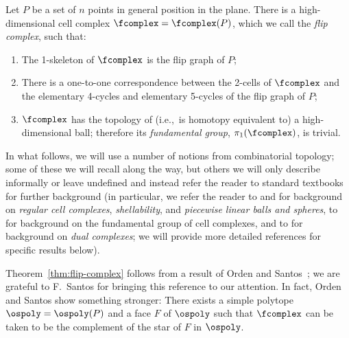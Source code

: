\begin{theorem}
\label{thm:flip-complex}
Let $P$ be a set of $n$ points in general position in the plane.
There is a high-dimensional cell complex $\fcomplex=\fcomplex(P)$, which we call the \emph{flip complex}, 
such that:
\begin{enumerate}
\item The 1-skeleton of $\fcomplex$ is the flip graph of $P$;
\item There is a one-to-one correspondence between the 2-cells of $\fcomplex$ and the elementary 4-cycles and elementary 5-cycles of the flip graph of $P$;
\item $\fcomplex$ has the topology of (i.e.,~is homotopy equivalent to) a high-dimensional ball; therefore its \emph{fundamental group}, $\pi_1(\fcomplex)$, is trivial.
\end{enumerate}
\end{theorem}

In what follows, we will use a number of notions from combinatorial topology; some of these 
we will recall along the way, but others we will only describe informally or leave undefined 
and instead refer the reader to standard textbooks for further background (in particular, we refer 
the reader to \cite[Appendix~4.7]{Bjorner:Oriented-matroids-1999} and \cite{Hudson:Piecewise-linear-topology-1969} for background on \emph{regular cell complexes}, \emph{shellability}, and \emph{piecewise linear balls and spheres}, to \cite{Stillwell:Classical-topology-and-combinatorial-group-1993} for background on the fundamental group of cell complexes, and to 
\cite{Hudson:Piecewise-linear-topology-1969,Munkres:Elements-of-algebraic-topology-1984}
for background on \emph{dual complexes}; we will provide more detailed references for specific 
results below).

Theorem~\ref{thm:flip-complex} follows from a result of Orden and Santos~\cite{Orden:The-polytope-of-non-crossing-graphs-on-a-planar-2005}; we are grateful to F.~Santos for bringing this reference to our attention. In fact, Orden and Santos show something stronger: There exists a simple polytope $\ospoly=\ospoly(P)$ and a face $F$ of $\ospoly$ such that $\fcomplex$ can be taken to be the complement of the star of $F$ in $\ospoly$.

